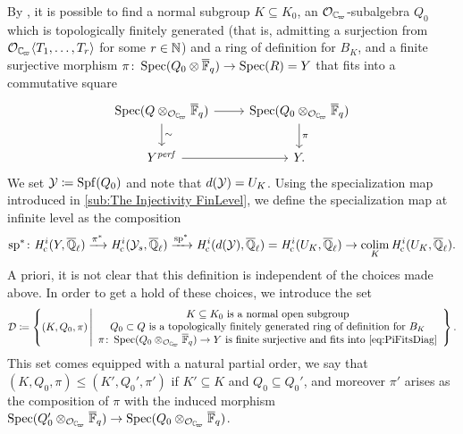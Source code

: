 \documentclass[../main.tex]{subfiles}
\begin{document}
By \cite[Lemma 3.16]{mieda2016geometric}, it is possible to find a normal
subgroup $K \subseteq K_0$,
an $\cO_\Cp$-subalgebra $Q_0$ which is topologically finitely generated (that is,
admitting a surjection from $\cO_\Cp \langle T_1, \dots, T_r \rangle$ for some $r
\in \mathbb{N}$) and a ring of definition for $B_K$, and a finite surjective
morphism $\pi\colon \operatorname{Spec}(Q_0 \otimes {\overline{\mathbb{F}}_q}) \to \operatorname{Spec}(R) = Y$ that fits into
a commutative square
\begin{equation}\label{eq:PiFitsDiag}
\begin{tikzcd}[ampersand replacement=\&]
  {\spec(Q \otimes_{\cO_\Cp} \Fqbar)} \& {\spec(Q_0 \otimes_{\cO_\Cp}\Fqbar)} \\
	{Y^\perf} \& {Y.}
	\arrow[from=1-1, to=1-2]
	\arrow["\sim", from=1-1, to=2-1]
	\arrow["\pi", from=1-2, to=2-2]
	\arrow[from=2-1, to=2-2]
\end{tikzcd}
\end{equation}
We set $\mathcal{Y} \coloneqq \operatorname{Spf}(Q_0)$ and note that $d(\mathcal{Y}) = U_K$. Using the
specialization map introduced in \cref{sub:The Injectivity FinLevel}, we define
the specialization map at infinite level as the composition
\begin{equation} \label{eq:DefSpecMapAtInfLevel}
  \mathrm{sp}^*\colon \mathit H_{\mathrm{c}}^i(Y, {\overline {\mathbb{Q}}_\ell}) \xrightarrow{\pi^*} \mathit H_{\mathrm{c}}^i(\mathcal{Y}_s, {\overline {\mathbb{Q}}_\ell}) 
  \xrightarrow{\mathrm{sp}^*} \mathit H_{\mathrm{c}}^i(d(\mathcal{Y}), {\overline {\mathbb{Q}}_\ell}) = \mathit H_{\mathrm{c}}^i(U_K, {\overline {\mathbb{Q}}_\ell})
  \to \operatorname*{colim}_K \mathit H_{\mathrm{c}}^i(U_K, {\overline {\mathbb{Q}}_\ell}).
\end{equation}
A priori, it is not clear that this definition is independent of the choices made 
above. In order to get a hold of these choices, we introduce the set
\begin{equation*}
  \cD \coloneqq \left\{ (K, Q_0, \pi) \, \middle \vert \begin{array}c
      K \subseteq K_0 \text{ is a normal open subgroup} \\
      Q_0 \subset Q \text{ is a topologically finitely generated ring of definition 
      for $B_K$} \\
      \pi\colon \spec(Q_0 \otimes_{\cO_\Cp} \Fqbar) \to Y \text{ is finite
        surjective and fits into \eqref{eq:PiFitsDiag}}
  \end{array}\right\}.
\end{equation*}
This set comes equipped with a natural partial order, we say that 
$(K, Q_0, \pi) \leq (K', Q_0', \pi')$ if $K' \subseteq K$ and $Q_0 \subseteq Q_0'$,
and moreover $\pi'$ arises as the composition of $\pi$ with the induced morphism 
$\spec(Q_0' \otimes_{\cO_\Cp} \Fqbar) \to \spec(Q_0 \otimes_{\cO_\Cp} \Fqbar)$. 
\end{document}
